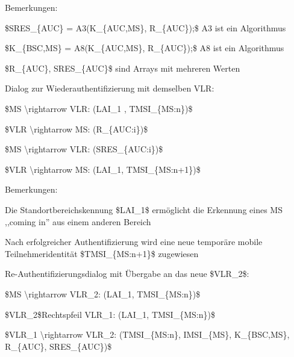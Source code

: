 \documentclass[a4paper]{article}
\begin{document}
\begin{multicols}{3}
      \begin{itemize*}
            \item Bemerkungen:
            \begin{itemize*}
                  \item \$SRES\_\{AUC\} = A3(K\_\{AUC,MS\}, R\_\{AUC\});\$ A3 ist ein Algorithmus
                  \item \$K\_\{BSC,MS\} = A8(K\_\{AUC,MS\}, R\_\{AUC\});\$ A8 ist ein Algorithmus
                  \item \$R\_\{AUC\}, SRES\_\{AUC\}\$ sind Arrays mit mehreren Werten
            \end{itemize*}
            \item Dialog zur Wiederauthentifizierung mit demselben VLR:
            \begin{enumerate*}
                  \def\labelenumi{\arabic{enumi}.}
                  \item \$MS \textbackslash rightarrow VLR: (LAI\_1 , TMSI\_\{MS:n\})\$
                  \item \$VLR \textbackslash rightarrow MS: (R\_\{AUC:i\})\$
                  \item \$MS \textbackslash rightarrow VLR: (SRES\_\{AUC:i\})\$
                  \item \$VLR \textbackslash rightarrow MS: (LAI\_1, TMSI\_\{MS:n+1\})\$
            \end{enumerate*}
            \item Bemerkungen:
            \begin{itemize*}
                  \item Die Standortbereichskennung \$LAI\_1\$ ermöglicht die Erkennung eines MS ,,coming in'' aus einem anderen Bereich
                  \item Nach erfolgreicher Authentifizierung wird eine neue temporäre mobile Teilnehmeridentität \$TMSI\_\{MS:n+1\}\$ zugewiesen
            \end{itemize*}
            \item Re-Authentifizierungsdialog mit Übergabe an das neue \$VLR\_2\$:
            \begin{enumerate*}
                  \def\labelenumi{\arabic{enumi}.}
                  \item \$MS \textbackslash rightarrow VLR\_2: (LAI\_1, TMSI\_\{MS:n\})\$
                  \item \$VLR\_2\$Rechtspfeil VLR\_1: (LAI\_1, TMSI\_\{MS:n\})\$
                  \item \$VLR\_1 \textbackslash rightarrow VLR\_2: (TMSI\_\{MS:n\}, IMSI\_\{MS\}, K\_\{BSC,MS\}, R\_\{AUC\}, SRES\_\{AUC\})\$

\end{enumerate*}
\end{itemize*}
\end{multicols}
\end{document}
